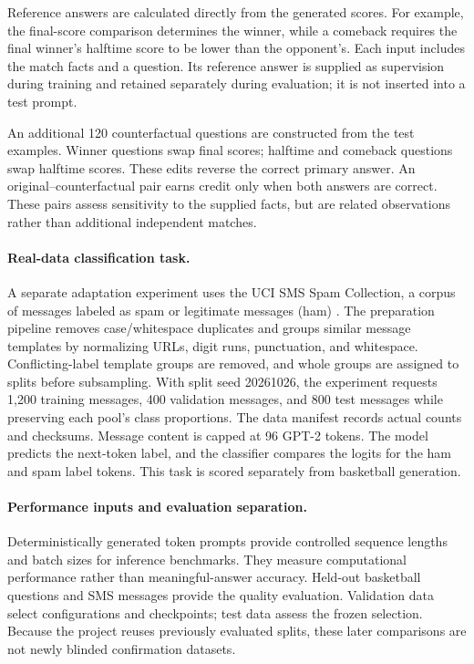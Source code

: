 Reference answers are calculated directly from the generated scores. For example, the final-score comparison determines the winner, while a comeback requires the final winner's halftime score to be lower than the opponent's. Each input includes the match facts and a question. Its reference answer is supplied as supervision during training and retained separately during evaluation; it is not inserted into a test prompt.

An additional 120 counterfactual questions are constructed from the test examples. Winner questions swap final scores; halftime and comeback questions swap halftime scores. These edits reverse the correct primary answer. An original--counterfactual pair earns credit only when both answers are correct. These pairs assess sensitivity to the supplied facts, but are related observations rather than additional independent matches.

\paragraph{Real-data classification task.}
A separate adaptation experiment uses the UCI SMS Spam Collection, a corpus of messages labeled as spam or legitimate messages (ham) \cite{uci_sms}. The preparation pipeline removes case/whitespace duplicates and groups similar message templates by normalizing URLs, digit runs, punctuation, and whitespace. Conflicting-label template groups are removed, and whole groups are assigned to splits before subsampling. With split seed 20261026, the experiment requests 1,200 training messages, 400 validation messages, and 800 test messages while preserving each pool's class proportions. The data manifest records actual counts and checksums. Message content is capped at 96 GPT-2 tokens. The model predicts the next-token label, and the classifier compares the logits for the ham and spam label tokens. This task is scored separately from basketball generation.

\paragraph{Performance inputs and evaluation separation.}
Deterministically generated token prompts provide controlled sequence lengths and batch sizes for inference benchmarks. They measure computational performance rather than meaningful-answer accuracy. Held-out basketball questions and SMS messages provide the quality evaluation. Validation data select configurations and checkpoints; test data assess the frozen selection. Because the project reuses previously evaluated splits, these later comparisons are not newly blinded confirmation datasets.

